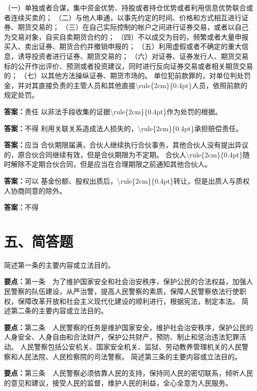 \documentclass[12pt]{ctexart}
\begin{document}
\begin{questions}
（一）单独或者合谋，集中资金优势、持股或者持仓优势或者利用信息优势联合或者连续买卖的；
（二）与他人串通，以事先约定的时间、价格和方式相互进行证券、期货交易的；
（三）在自己实际控制的帐户之间进行证券交易，或者以自己为交易对象，自买自卖期货合约的；
（四）不以成交为目的，频繁或者大量申报买入、卖出证券、期货合约并撤销申报的；
（五）利用虚假或者不确定的重大信息，诱导投资者进行证券、期货交易的；
（六）对证券、证券发行人、期货交易标的公开作出评价、预测或者投资建议，同时进行反向证券交易或者相关期货交易的；
（七）以其他方法操纵证券、期货市场的。
单位犯前款罪的，对单位判处罚金，并对其直接负责的主管人员和其他直接\textbackslash{}rule\{2cm\}\{0.4pt\}人员，依照前款的规定处罚。
\ifprintanswers\par\textbf{答案：}责任\fi
\question 以非法手段收集的证据\textbackslash{}rule\{2cm\}\{0.4pt\}作为处罚的根据。
\ifprintanswers\par\textbf{答案：}不得\fi
\question 利用关联关系造成法人损失的，\textbackslash{}rule\{2cm\}\{0.4pt\}承担赔偿责任。
\ifprintanswers\par\textbf{答案：}应当\fi
\question 合伙期限届满，合伙人继续执行合伙事务，其他合伙人没有提出异议的，原合伙合同继续有效，但是合伙期限为不定期。
合伙人\textbackslash{}rule\{2cm\}\{0.4pt\}随时解除不定期合伙合同，但是应当在合理期限之前通知其他合伙人。
\ifprintanswers\par\textbf{答案：}可以\fi
\question 基金份额、股权出质后，\textbackslash{}rule\{2cm\}\{0.4pt\}转让，但是出质人与质权人协商同意的除外。
\ifprintanswers\par\textbf{答案：}不得\fi
\end{questions}
\section*{五、简答题}
\begin{questions}
\question 简述第一条的主要内容或立法目的。
\ifprintanswers\par\textbf{要点：}第一条　为了维护国家安全和社会治安秩序，保护公民的合法权益，加强人民警察的队伍建设，从严治警，提高人民警察的素质，保障人民警察依法行使职权，保障改革开放和社会主义现代化建设的顺利进行，根据宪法，制定本法。\fi
\question 简述第二条的主要内容或立法目的。
\ifprintanswers\par\textbf{要点：}第二条　人民警察的任务是维护国家安全，维护社会治安秩序，保护公民的人身安全、人身自由和合法财产，保护公共财产，预防、制止和惩治违法犯罪活动。
人民警察包括公安机关、国家安全机关、监狱、劳动教养管理机关的人民警察和人民法院、人民检察院的司法警察。\fi
\question 简述第三条的主要内容或立法目的。
\ifprintanswers\par\textbf{要点：}第三条　人民警察必须依靠人民的支持，保持同人民的密切联系，倾听人民的意见和建议，接受人民的监督，维护人民的利益，全心全意为人民服务。\fi
\end{questions}
\end{document}
